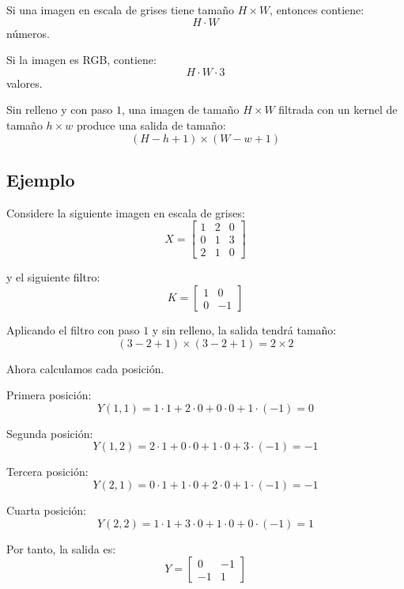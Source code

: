 \documentclass[12pt]{article}
\begin{document}
Si una imagen en escala de grises tiene tamaño \(H \times W\), entonces contiene:
\[
H \cdot W
\]
números.

Si la imagen es RGB, contiene:
\[
H \cdot W \cdot 3
\]
valores.

Sin relleno y con paso \(1\), una imagen de tamaño \(H \times W\) filtrada con un kernel de tamaño \(h \times w\) produce una salida de tamaño:
\[
(H-h+1)\times(W-w+1)
\]

\subsection{Ejemplo}
Considere la siguiente imagen en escala de grises:
\[
X=
\begin{bmatrix}
1 & 2 & 0 \\
0 & 1 & 3 \\
2 & 1 & 0
\end{bmatrix}
\]

y el siguiente filtro:
\[
K=
\begin{bmatrix}
1 & 0 \\
0 & -1
\end{bmatrix}
\]

Aplicando el filtro con paso \(1\) y sin relleno, la salida tendrá tamaño:
\[
(3-2+1)\times(3-2+1)=2\times 2
\]

Ahora calculamos cada posición.

Primera posición:
\[
Y(1,1)=
1\cdot 1 + 2\cdot 0 + 0\cdot 0 + 1\cdot(-1)=0
\]

Segunda posición:
\[
Y(1,2)=
2\cdot 1 + 0\cdot 0 + 1\cdot 0 + 3\cdot(-1)=-1
\]

Tercera posición:
\[
Y(2,1)=
0\cdot 1 + 1\cdot 0 + 2\cdot 0 + 1\cdot(-1)=-1
\]

Cuarta posición:
\[
Y(2,2)=
1\cdot 1 + 3\cdot 0 + 1\cdot 0 + 0\cdot(-1)=1
\]

Por tanto, la salida es:
\[
Y=
\begin{bmatrix}
0 & -1 \\
-1 & 1
\end{bmatrix}
\]
\end{document}
